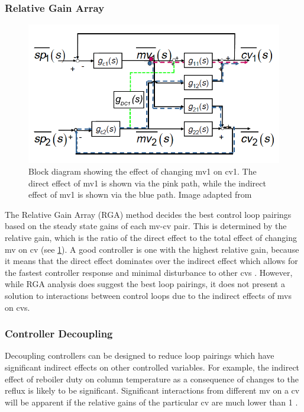 \subsubsection{Relative Gain Array}
    \begin{figure}
        \vspace{-\intextsep}
        \centering
        \includegraphics[width=\linewidth]{chapters/4-operation-control/4-Figures/RGA-Thornhill-2013.png}
        \caption{Block diagram showing the effect of changing mv1 on cv1. The direct effect of mv1 is shown via the pink path, while the indirect effect of mv1 is shown via the blue path. Image adapted from \textcite{thornhill_process_2009}}
        \label{fig:RGA-block-di}
    \end{figure}
The Relative Gain Array (RGA) method decides the best control loop pairings based on the steady state gains of each mv-cv pair. This is determined by the relative gain, which is the ratio of the direct effect to the total effect of changing mv on cv (see \cref{fig:RGA-block-di}). A good controller is one with the highest relative gain, because it means that the direct effect dominates over the indirect effect which allows for the fastest controller response and minimal disturbance to other cvs \cite{seborg_process_2011}. However, while RGA analysis does suggest the best loop pairings, it does not present a solution to interactions between control loops due to the indirect effects of mvs on cvs.

\subsubsection{Controller Decoupling}
Decoupling controllers can be designed to reduce loop pairings which have significant indirect effects on other controlled variables. For example, the indirect effect of reboiler duty on column temperature as a consequence of changes to the reflux is likely to be significant. Significant interactions from different mv on a cv will be apparent if the relative gains of the particular cv are much lower than 1 \cite{lim_121_2020}. 

